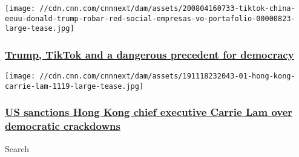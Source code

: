 \href{/2020/08/08/business/trump-tiktok-democracy-intl/index.html}{}

\texttt{[image: //cdn.cnn.com/cnnnext/dam/assets/200804160733-tiktok-china-eeuu-donald-trump-robar-red-social-empresas-vo-portafolio-00000823-large-tease.jpg]}

\hypertarget{trump-tiktok-and-a-dangerous-precedent-for-democracy-}{%
\subsubsection{\texorpdfstring{\href{/2020/08/08/business/trump-tiktok-democracy-intl/index.html}{Trump,
TikTok and a dangerous precedent for democracy
}}{Trump, TikTok and a dangerous precedent for democracy }}\label{trump-tiktok-and-a-dangerous-precedent-for-democracy-}}

\href{/2020/08/07/politics/us-sanctions-carrie-lam/index.html}{}

\texttt{[image: //cdn.cnn.com/cnnnext/dam/assets/191118232043-01-hong-kong-carrie-lam-1119-large-tease.jpg]}

\hypertarget{us-sanctions-hong-kong-chief-executive-carrie-lam-over-democratic-crackdowns}{%
\subsubsection{\texorpdfstring{\href{/2020/08/07/politics/us-sanctions-carrie-lam/index.html}{US
sanctions Hong Kong chief executive Carrie Lam over democratic
crackdowns}}{US sanctions Hong Kong chief executive Carrie Lam over democratic crackdowns}}\label{us-sanctions-hong-kong-chief-executive-carrie-lam-over-democratic-crackdowns}}

Search

